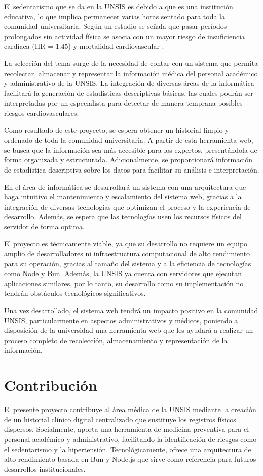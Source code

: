     El sedentarismo que se da en la UNSIS es debido a que es una institución educativa, lo que implica permanecer varias horas sentado para toda la comunidad universitaria. Según un estudio se señala que pasar períodos prolongados sin actividad física 
    se asocia con un mayor riesgo de insuficiencia cardíaca (HR = 1.45) y mortalidad cardiovascular \textcite{Ajufo2025SedentaryCVD}.

    La selección del tema surge de la necesidad de contar con un sistema que permita recolectar, almacenar y representar la información médica del personal académico y administrativo de la UNSIS. La integración de diversas áreas de la informática facilitará la generación de estadísticas descriptivas básicas, las cuales podrán ser interpretadas por un especialista para detectar de manera temprana posibles riesgos cardiovasculares.
    
    Como resultado de este proyecto, se espera obtener un historial limpio y ordenado de toda la comunidad universitaria. A partir de esta herramienta web, se busca que la información sea más accesible para los expertos, presentándola de forma organizada y estructurada. Adicionalmente, se proporcionará información de estadística descriptiva sobre los datos para facilitar su análisis e interpretación.

    En el área de informática se desarrollará un sistema con una arquitectura que haga intuitivo el mantenimiento y escalamiento del sistema web, gracias a la integración de diversas tecnologías que optimizan el proceso y la experiencia de desarrollo. Además, se espera que las tecnologías usen los recursos físicos del servidor de forma optima.

    El proyecto es técnicamente viable, ya que su desarrollo no requiere un equipo amplio de desarrolladores ni infraestructura computacional de alto rendimiento para su operación, gracias al tamaño del sistema y a la eficiencia de tecnologías como Node y Bun. Además, la UNSIS ya cuenta con servidores que ejecutan aplicaciones similares, por lo tanto, su desarrollo como su implementación no tendrán obstáculos tecnológicos significativos.
    
    Una vez desarrollado, el sistema web tendrá un impacto positivo en la comunidad UNSIS, particularmente en aspectos administrativos y médicos, poniendo a disposición de la universidad una herramienta web que les ayudará a realizar un proceso completo de recolección, almacenamiento y representación de la información.

\section{Contribución}
    El presente proyecto contribuye al área médica de la UNSIS mediante la creación de un historial clínico digital centralizado que sustituye los registros físicos dispersos. Socialmente, aporta una herramienta de medicina preventiva para el personal académico y administrativo, facilitando la identificación de riesgos como el sedentarismo y la hipertensión. Tecnológicamente, ofrece una arquitectura de alto rendimiento basada en Bun y Node.js que sirve como referencia para futuros desarrollos institucionales.
